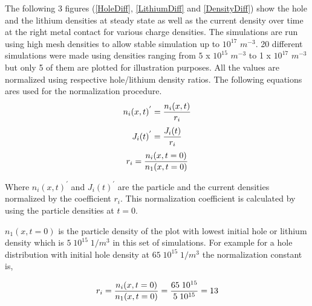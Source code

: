 \begin{doublespace}
 The following 3 figures (\ref{HoleDiff}, \ref{LithiumDiff} and \ref{DensityDiff}) show the hole and the lithium densities at steady state as well as the current density over time at the right metal contact for various charge densities. The simulations are run using high mesh densities to allow stable simulation up to $10^{17}$ $m^{-3}$. 20 different simulations were made using densities ranging from $5$ x $10^{15}$  $m^{-3}$ to 1 x $10^{17}$  $m^{-3}$ but only 5 of them are plotted for illustration purposes. All the values are normalized using respective hole/lithium density ratios. The following equations ares used for the normalization procedure.
\begin{equation}
\centering
n_{i}(x,t)^{'}= \frac{n_{i}(x,t)}{r_i} 
\end{equation}
\begin{equation}
\centering
J_{i}(t)^{'}= \frac{J_i(t)}{r_i} 
\end{equation}
\begin{equation}
\centering
r_i = \frac{n_{i}(x,t=0)}{n_{1}(x,t=0)}
\label{NormConst}
\end{equation}

Where $n_{i}(x,t)^{'}$ and $J_{i}(t)^{'}$ are the particle and the current densities normalized by the coefficient $r_{i}$. This normalization coefficient is calculated by using the particle densities at $t=0$. 

$n_{1}(x,t=0)$ is the particle density of the plot with lowest initial hole or lithium density which is $5\;10^{15}\;1/m^3$ in this set of simulations. For example for a hole distribution with initial hole density at $65\;10^{15}\;1/m^3$ the normalization constant is,

\begin{equation}
\centering
r_i = \frac{n_{i}(x,t=0)}{n_{1}(x,t=0)} = \frac{65\;10^{15} }{5\;10^{15}} = 13
\label{NormConstVal}
\end{equation}


\end{doublespace}
